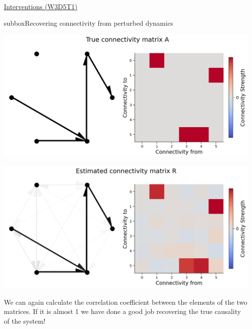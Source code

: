 \begin{textbox}{\href{https://compneuro.neuromatch.io/tutorials/W3D5_NetworkCausality/student/W3D5_Tutorial1.html}{Interventions (W3D5T1)}   }
\begin{subbox}{subbox}{Recovering connectivity from perturbed dynamics}
\begin{center}
\includegraphics[scale=0.2]{Figures/NC/NC_Figure6.png}
\end{center}
\begin{center}
    
\includegraphics[scale=0.2]{Figures/NC/NC_Figure7.png}
\end{center}
We can again calculate the correlation coefficient between the elements of the two matrices.
If it is almost 1 we have done a good job recovering the true causality of the system!

\end{subbox}
\end{textbox}
\newpage
